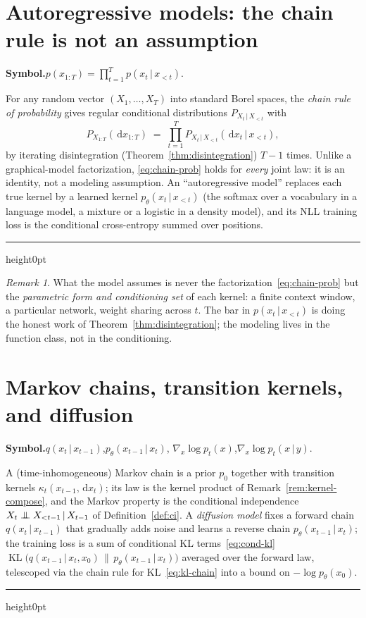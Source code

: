 \documentclass[11pt,oneside]{report}
\theoremstyle{plain}
\theoremstyle{definition}
\theoremstyle{remark}
\newtheorem{remark}[theorem]{Remark}
\newenvironment{mlentry}[1]%
  {\par\medskip\noindent\textbf{Symbol.}\quad #1\par\nobreak\smallskip}%
  {\par\medskip\hrule height0pt\medskip}
\newcommand{\dd}{\,\mathrm{d}}
\newcommand{\given}{\,\vert\,}
\newcommand{\indep}{\mathrel{\perp\mkern-10mu\perp}}
\DeclareMathOperator{\KL}{KL}
\numberwithin{equation}{chapter}
\begin{document}
\section{Autoregressive models: the chain rule is not an assumption}
\label{sec:autoreg}

\begin{mlentry}{$p(x_{1:T})=\prod_{t=1}^T p(x_t\given x_{<t})$.}
For any random vector $(X_1,\dots,X_T)$ into standard Borel spaces, the
\emph{chain rule of probability} gives regular conditional distributions
$P_{X_t\given X_{<t}}$ with
\begin{equation}\label{eq:chain-prob}
  P_{X_{1:T}}(\dd x_{1:T})
   \;=\;\prod_{t=1}^T P_{X_t\given X_{<t}}(\dd x_t\given x_{<t}),
\end{equation}
by iterating disintegration (Theorem~\ref{thm:disintegration}) $T-1$ times.
Unlike a graphical-model factorization, \eqref{eq:chain-prob} holds for
\emph{every} joint law: it is an identity, not a modeling assumption. An
``autoregressive model'' replaces each true kernel by a learned kernel
$p_\theta(x_t\given x_{<t})$ (the softmax over a vocabulary in a language
model, a mixture or a logistic in a density model), and its NLL training
loss is the conditional cross-entropy summed over positions.
\end{mlentry}

\begin{remark}
What the model assumes is never the factorization~\eqref{eq:chain-prob} but
the \emph{parametric form and conditioning set} of each kernel: a finite
context window, a particular network, weight sharing across $t$. The bar in
$p(x_t\given x_{<t})$ is doing the honest work of
Theorem~\ref{thm:disintegration}; the modeling lives in the function class,
not in the conditioning.
\end{remark}

\section{Markov chains, transition kernels, and diffusion}
\label{sec:markov-diffusion}

\begin{mlentry}{$q(x_t\given x_{t-1})$,\quad $p_\theta(x_{t-1}\given x_t)$,\quad
$\nabla_x\log p_t(x)$,\quad $\nabla_x\log p_t(x\given y)$.}
A (time-inhomogeneous) Markov chain is a prior $p_0$ together with
transition kernels $\kappa_t(x_{t-1},\dd x_t)$; its law is the kernel
product of Remark~\ref{rem:kernel-compose}, and the Markov property is the
conditional independence $X_t\indep X_{<t-1}\given X_{t-1}$ of
Definition~\ref{def:ci}. A \emph{diffusion model} fixes a forward chain
$q(x_t\given x_{t-1})$ that gradually adds noise and learns a reverse chain
$p_\theta(x_{t-1}\given x_t)$; the training loss is a sum of conditional
KL terms~\eqref{eq:cond-kl}
$\KL\bigl(q(x_{t-1}\given x_t,x_0)\,\|\,p_\theta(x_{t-1}\given x_t)\bigr)$
averaged over the forward law, telescoped via the chain rule for
KL~\eqref{eq:kl-chain} into a bound on $-\log p_\theta(x_0)$.
\end{mlentry}
\end{document}
